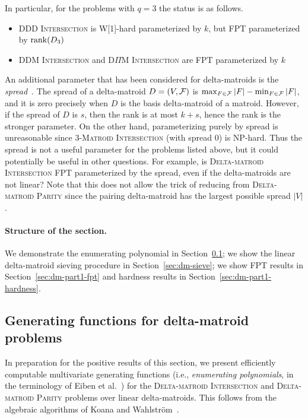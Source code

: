 In particular, for the problems with $q=3$ the status is as follows.
\begin{itemize}
\item \textsc{DDD Intersection} is W[1]-hard parameterized by $k$,
  but FPT parameterized by $\operatorname{rank}(D_3)$
\item \textsc{DDM Intersection} and \textsc{D$\Pi$M Intersection}
  are FPT parameterized by $k$
\end{itemize}

An additional parameter that has been considered for delta-matroids is
the \emph{spread}~\cite{Moffatt19deltamatroids}. The spread of a
delta-matroid $D=(V,\mathcal F)$ is $\max_{F \in \mathcal F} |F|-\min_{F \in \mathcal F} |F|$, 
and it is zero precisely when $D$ is the basis delta-matroid of a matroid.
However, if the spread of $D$ is $s$, then the rank is at most $k+s$,
hence the rank is the stronger parameter. On the other hand,
parameterizing purely by spread is unreasonable since
\textsc{3-Matroid Intersection} (with spread 0) is NP-hard. 
Thus the spread is not a useful parameter for the problems listed
above, but it could potentially be useful in other questions.
For example, is \textsc{Delta-matroid Intersection} FPT parameterized
by the spread, even if the delta-matroids are not linear?
Note that this does not allow the trick of reducing from
\textsc{Delta-matroid Parity} since the pairing delta-matroid has
the largest possible spread $|V|$. 

\paragraph*{Structure of the section.}
We demonstrate the enumerating polynomial in Section~\ref{sec:dm-gf};
we show the linear delta-matroid sieving procedure in Section~\ref{sec:dm-sieve};
we show FPT results in Section~\ref{sec:dm-part1-fpt} and
hardness results in Section~\ref{sec:dm-part1-hardness}.

\subsection{Generating functions for delta-matroid problems}
\label{sec:dm-gf}
In preparation for the positive results of this section, we present efficiently computable 
multivariate generating functions (i.e., \emph{enumerating polynomials}, in the terminology of Eiben et al.~\cite{EKW23})
for the \textsc{Delta-matroid Intersection} and \textsc{Delta-matroid Parity} problems over linear delta-matroids.
This follows from the algebraic algorithms of Koana and Wahlström~\cite{KW24}.

